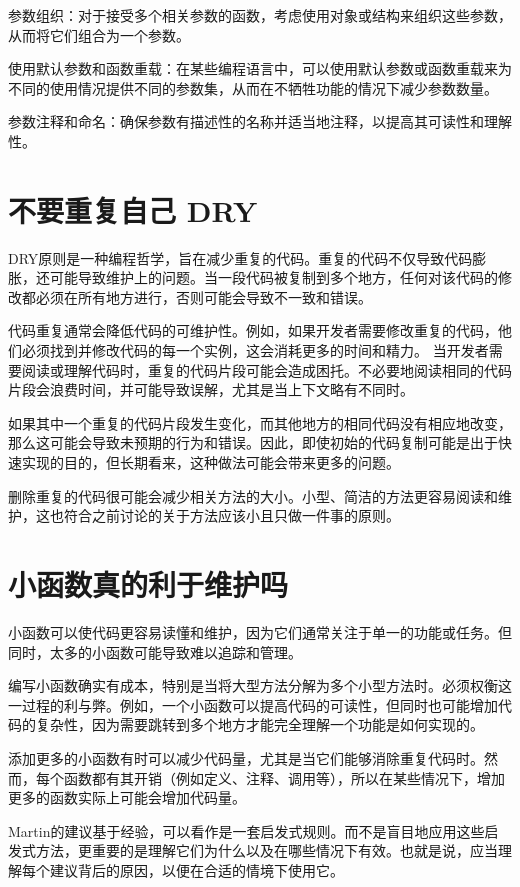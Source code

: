参数组织：对于接受多个相关参数的函数，考虑使用对象或结构来组织这些参数，从而将它们组合为一个参数。

使用默认参数和函数重载：在某些编程语言中，可以使用默认参数或函数重载来为不同的使用情况提供不同的参数集，从而在不牺牲功能的情况下减少参数数量。

参数注释和命名：确保参数有描述性的名称并适当地注释，以提高其可读性和理解性。

\section{不要重复自己 DRY}
DRY原则是一种编程哲学，旨在减少重复的代码。重复的代码不仅导致代码膨胀，还可能导致维护上的问题。当一段代码被复制到多个地方，任何对该代码的修改都必须在所有地方进行，否则可能会导致不一致和错误。

代码重复通常会降低代码的可维护性。例如，如果开发者需要修改重复的代码，他们必须找到并修改代码的每一个实例，这会消耗更多的时间和精力。
当开发者需要阅读或理解代码时，重复的代码片段可能会造成困托。不必要地阅读相同的代码片段会浪费时间，并可能导致误解，尤其是当上下文略有不同时。

如果其中一个重复的代码片段发生变化，而其他地方的相同代码没有相应地改变，那么这可能会导致未预期的行为和错误。因此，即使初始的代码复制可能是出于快速实现的目的，但长期看来，这种做法可能会带来更多的问题。

删除重复的代码很可能会减少相关方法的大小。小型、简洁的方法更容易阅读和维护，这也符合之前讨论的关于方法应该小且只做一件事的原则。

\section{小函数真的利于维护吗}
小函数可以使代码更容易读懂和维护，因为它们通常关注于单一的功能或任务。但同时，太多的小函数可能导致难以追踪和管理。

编写小函数确实有成本，特别是当将大型方法分解为多个小型方法时。必须权衡这一过程的利与弊。例如，一个小函数可以提高代码的可读性，但同时也可能增加代码的复杂性，因为需要跳转到多个地方才能完全理解一个功能是如何实现的。

添加更多的小函数有时可以减少代码量，尤其是当它们能够消除重复代码时。然而，每个函数都有其开销（例如定义、注释、调用等），所以在某些情况下，增加更多的函数实际上可能会增加代码量。

Martin的建议基于经验，可以看作是一套启发式规则。而不是盲目地应用这些启发式方法，更重要的是理解它们为什么以及在哪些情况下有效。也就是说，应当理解每个建议背后的原因，以便在合适的情境下使用它。

